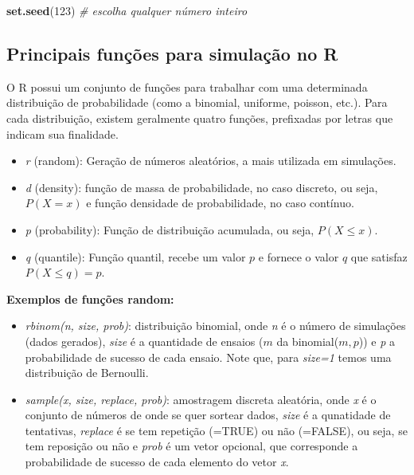 \documentclass[
]{book}
\newenvironment{Shaded}{\begin{snugshade}}{\end{snugshade}}
\newcommand{\CommentTok}[1]{\textcolor[rgb]{0.56,0.35,0.01}{\textit{#1}}}
\newcommand{\DecValTok}[1]{\textcolor[rgb]{0.00,0.00,0.81}{#1}}
\newcommand{\FunctionTok}[1]{\textcolor[rgb]{0.13,0.29,0.53}{\textbf{#1}}}
\newcommand{\NormalTok}[1]{#1}
\providecommand{\tightlist}{%
  \setlength{\itemsep}{0pt}\setlength{\parskip}{0pt}}
\begin{document}
\begin{Shaded}
\begin{Highlighting}[]
\FunctionTok{set.seed}\NormalTok{(}\DecValTok{123}\NormalTok{) }\CommentTok{\# escolha qualquer número inteiro}
\end{Highlighting}
\end{Shaded}

\subsection{Principais funções para simulação no R}\label{principais-funuxe7uxf5es-para-simulauxe7uxe3o-no-r}

O R possui um conjunto de funções para trabalhar com uma determinada distribuição de probabilidade (como a binomial, uniforme, poisson, etc.). Para cada distribuição, existem geralmente quatro funções, prefixadas por letras que indicam sua finalidade.

\begin{itemize}
\tightlist
\item
  \emph{r} (random): Geração de números aleatórios, a mais utilizada em simulações.
\item
  \emph{d} (density): função de massa de probabilidade, no caso discreto, ou seja, \(P(X = x)\) e função densidade de probabilidade, no caso contínuo.
\item
  \emph{p} (probability): Função de distribuição acumulada, ou seja, \(P(X \leq x)\).
\item
  \emph{q} (quantile): Função quantil, recebe um valor \(p\) e fornece o valor \(q\) que satisfaz \(P(X \leq q) = p\).
\end{itemize}

\textbf{Exemplos de funções random:}

\begin{itemize}
\tightlist
\item
  \emph{rbinom(n, size, prob)}: distribuição binomial, onde \emph{n} é o número de simulações (dados gerados), \emph{size} é a quantidade de ensaios (\(m\) da binomial(\(m, p\))) e \emph{p} a probabilidade de sucesso de cada ensaio. Note que, para \emph{size=1} temos uma distribuição de Bernoulli.
\item
  \emph{sample(x, size, replace, prob)}: amostragem discreta aleatória, onde \emph{x} é o conjunto de números de onde se quer sortear dados, \emph{size} é a qunatidade de tentativas, \emph{replace} é se tem repetição (=TRUE) ou não (=FALSE), ou seja, se tem reposição ou não e \emph{prob} é um vetor opcional, que corresponde a probabilidade de sucesso de cada elemento do vetor \emph{x}.
\end{itemize}
\end{document}

